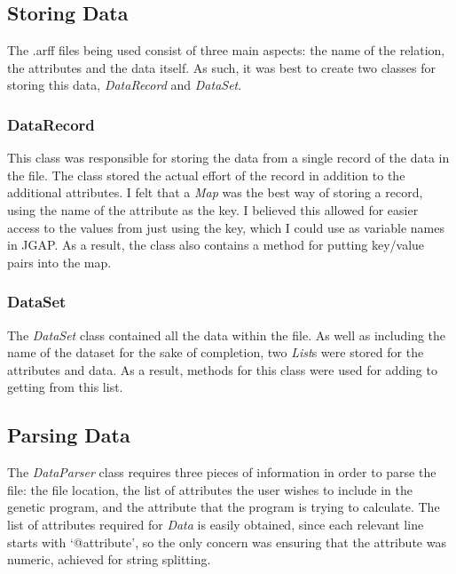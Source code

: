 \documentclass[11pt, a4paper]{article}
\begin{document}
\subsection{Storing Data} %
\label{sub:storing_data}
The .arff files being used consist of three main aspects: the name of the
relation, the attributes and the data itself. As such, it was best to create two
classes for storing this data, \emph{DataRecord} and \emph{DataSet}.

\subsubsection{DataRecord} %
\label{ssub:datarecord}
This class was responsible for storing the data from a single record of the data
in the file. The class stored the actual effort of the record in addition to the
additional attributes. I felt that a \emph{Map} was the best way of storing a
record, using the name of the attribute as the key. I believed this allowed for
easier access to the values from just using the key, which I could use as
variable names in JGAP. As a result, the class also contains a method for
putting key/value pairs into the map.

\subsubsection{DataSet} %
\label{ssub:dataset}
The \emph{DataSet} class contained all the data within the file. As well as
including the name of the dataset for the sake of completion, two \emph{List}s
were stored for the attributes and data. As a result, methods for this class
were used for adding to getting from this list.

\subsection{Parsing Data} %
\label{sub:parsing_data}
The \emph{DataParser} class requires three pieces of information in order to
parse the file: the file location, the list of attributes the user wishes to
include in the genetic program, and the attribute that the program is trying to
calculate. The list of attributes required for \emph{Data} is easily obtained,
since each relevant line starts with `@attribute', so the only concern was
ensuring that the attribute was numeric, achieved for string splitting.
\end{document}
